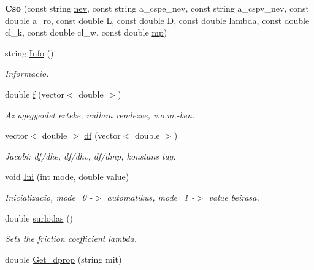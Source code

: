 \begin{DoxyCompactItemize}
\item 
{\bfseries Cso} (const string \hyperlink{class_agelem_abe92b7e3912367d5d1caf6b277ca0b7d}{nev}, const string a\+\_\+cspe\+\_\+nev, const string a\+\_\+cspv\+\_\+nev, const double a\+\_\+ro, const double L, const double D, const double lambda, const double cl\+\_\+k, const double cl\+\_\+w, const double \hyperlink{class_agelem_a1377d80d8511cc4adacccba31d28282d}{mp})\hypertarget{class_cso_ab04f2170382860dcff777b7185c62ba7}{}\label{class_cso_ab04f2170382860dcff777b7185c62ba7}

\item 
string \hyperlink{class_cso_af6a08482d5949b0924459b7588efd2a0}{Info} ()\hypertarget{class_cso_af6a08482d5949b0924459b7588efd2a0}{}\label{class_cso_af6a08482d5949b0924459b7588efd2a0}

\begin{DoxyCompactList}\small\item\em Informacio. \end{DoxyCompactList}\item 
double \hyperlink{class_cso_a5b0e37d3a2f6095e958a7c5f27d8e060}{f} (vector$<$ double $>$)\hypertarget{class_cso_a5b0e37d3a2f6095e958a7c5f27d8e060}{}\label{class_cso_a5b0e37d3a2f6095e958a7c5f27d8e060}

\begin{DoxyCompactList}\small\item\em Az agegyenlet erteke, nullara rendezve, v.\+o.\+m.-\/ben. \end{DoxyCompactList}\item 
vector$<$ double $>$ \hyperlink{class_cso_acc0b1bb6f9558475a097219d88d07267}{df} (vector$<$ double $>$)\hypertarget{class_cso_acc0b1bb6f9558475a097219d88d07267}{}\label{class_cso_acc0b1bb6f9558475a097219d88d07267}

\begin{DoxyCompactList}\small\item\em Jacobi\+: df/dhe, df/dhv, df/dmp, konstans tag. \end{DoxyCompactList}\item 
void \hyperlink{class_cso_aad51dd17829b413a41f1afb0c275d55c}{Ini} (int mode, double value)\hypertarget{class_cso_aad51dd17829b413a41f1afb0c275d55c}{}\label{class_cso_aad51dd17829b413a41f1afb0c275d55c}

\begin{DoxyCompactList}\small\item\em Inicializacio, mode=0 -\/$>$ automatikus, mode=1 -\/$>$ value beirasa. \end{DoxyCompactList}\item 
double \hyperlink{class_cso_a01d6ba01b924fe317638fe196a139d1f}{surlodas} ()
\begin{DoxyCompactList}\small\item\em Sets the friction coefficient lambda. \end{DoxyCompactList}\item 
double \hyperlink{class_cso_a674c356a597eb9d6c9a46726b35e2a00}{Get\+\_\+dprop} (string mit)\hypertarget{class_cso_a674c356a597eb9d6c9a46726b35e2a00}{}\label{class_cso_a674c356a597eb9d6c9a46726b35e2a00}


\end{DoxyCompactItemize}
